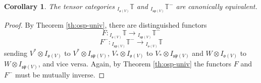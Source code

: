 \documentclass[11pt]{article}
\theoremstyle{plain}
\newtheorem{corollary}[lemma]{Corollary}
\theoremstyle{nonumberplain}
\theoremstyle{plain}
\numberwithin{equation}{section}
\theoremstyle{nonumberplain}
\newtheorem{proof}{Proof}
\newcommand\bT{{\mathbb T}}
\newcommand\fo{{\mathfrak o}}
\newcommand\fp{{\mathfrak p}}
\newcommand\fs{{\mathfrak s}}
\newcommand\1{{\bf 1}}
\begin{document}
\begin{corollary}
	The tensor categories ${}_{I_{\fo(V)}}\bT$ and ${}_{I_{\fs\fp(V)}}\bT^-$ are canonically equivalent.
\end{corollary}

\begin{proof}
	By Theorem \ref{th:osp-univ}, there are distinguished functors \begin{equation*}
	F:{}_{I_{\fo(V)}}\bT\rightarrow {}_{I_{\fs\fp(V)}}\bT^-
	\end{equation*}
	\begin{equation*}
	F^-:{}_{I_{\fs\fp(V)}}\bT^-\rightarrow {}_{I_{\fo(V)}}\bT
	\end{equation*}
	sending $V^* \otimes I_{\fo(V)}$ to $V^*\otimes I_{\fs\fp(V)}$, $V_* \otimes I_{\fo(V)}$ to $V_* \otimes I_{\fs\fp(V)}$ and $W \otimes I_{\fo(V)}$ to $W \otimes I_{\fs\fp(V)}$, and vice versa. Again, by Theorem \ref{th:osp-univ} the functors $F$ and $F^-$ must be mutually inverse.
	
\end{proof}





{}






\Addresses
\end{document}
